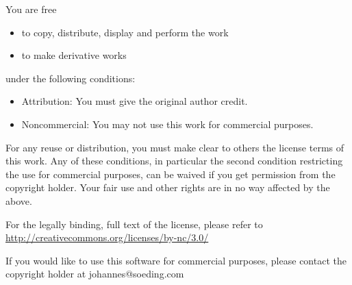 \documentclass[11pt,a4paper]{article}
\begin{document}
You are free
\begin{itemize}
  \item{to copy, distribute, display and perform the work}
  \item{to make derivative works}
\end{itemize}
under the following conditions:
\begin{itemize}
  \item{Attribution: You must give the original author credit.}
  \item{Noncommercial: You may not use this work for commercial purposes.}
\end{itemize}
For any reuse or distribution, you must make clear to others the license terms of this work.
Any of these conditions, in particular the second condition restricting the use for commercial purposes, 
can be waived if you get permission from the copyright holder.
Your fair use and other rights are in no way affected by the above.

For the legally binding, full text of the license, please refer to \url{http://creativecommons.org/licenses/by-nc/3.0/}

If you would like to use this software for commercial purposes, please contact the copyright holder at 
johannes@soeding.com

\newpage
\end{document}
